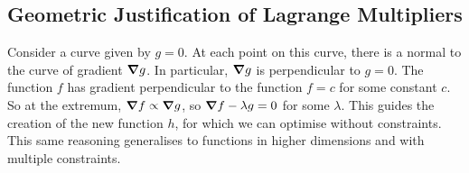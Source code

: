 \subsection{Geometric Justification of Lagrange Multipliers}
Consider a curve given by \(g = 0\).
At each point on this curve, there is a normal to the curve of gradient \(\grad{g}\).
In particular, \(\grad{g}\) is perpendicular to \(g = 0\).
The function \(f\) has gradient perpendicular to the function \(f = c\) for some constant \(c\).
So at the extremum, \(\grad{f} \propto \grad{g}\), so \(\grad{f - \lambda g} = 0\) for some \(\lambda\).
This guides the creation of the new function \(h\), for which we can optimise without constraints.
This same reasoning generalises to functions in higher dimensions and with multiple constraints.
